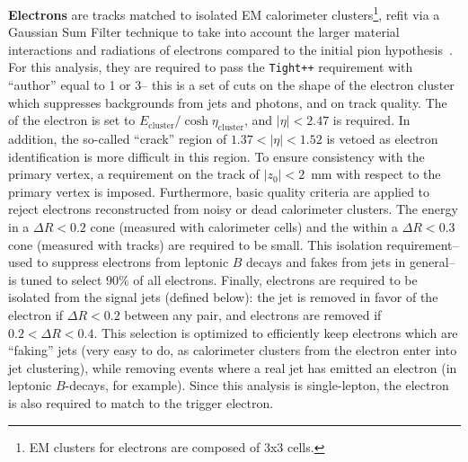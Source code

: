	\textbf{Electrons} are tracks matched to isolated EM calorimeter clusters\footnote{EM clusters for electrons are composed of 3x3 cells.}, refit via a Gaussian Sum Filter technique to take into account the larger material interactions and radiations of electrons compared to the initial pion hypothesis~. For this analysis, they are required to pass the \texttt{Tight++} requirement with ``author'' equal to 1 or 3-- this is a set of cuts on the shape of the electron cluster which suppresses backgrounds from jets and photons, and on track quality. The \pt of the electron is set to $E_\mathrm{cluster} / \cosh \eta_\mathrm{cluster}$, and $|\eta| < 2.47$ is required. In addition, the so-called ``crack'' region of $1.37 < |\eta| < 1.52$ is vetoed as electron identification is more difficult in this region. To ensure consistency with the primary vertex, a requirement on the track of $|z_0| < 2$~mm with respect to the primary vertex is imposed. Furthermore, basic quality criteria are applied to reject electrons reconstructed from noisy or dead calorimeter clusters. The energy in a $\Delta R < 0.2$ cone (measured with calorimeter cells) and the \pt within a $\Delta R < 0.3$ cone (measured with tracks) are required to be small. This isolation requirement-- used to suppress electrons from leptonic $B$ decays and fakes from jets in general-- is tuned to select $90\%$ of all electrons. Finally, electrons are required to be isolated from the signal jets (defined below): the jet is removed in favor of the electron if $\Delta R < 0.2$ between any pair, and electrons are removed if $0.2 < \Delta R < 0.4$. This selection is optimized to efficiently keep electrons which are ``faking'' jets (very easy to do, as calorimeter clusters from the electron enter into jet clustering), while removing events where a real jet has emitted an electron (in leptonic $B$-decays, for example). Since this analysis is single-lepton, the electron is also required to match to the trigger electron.

